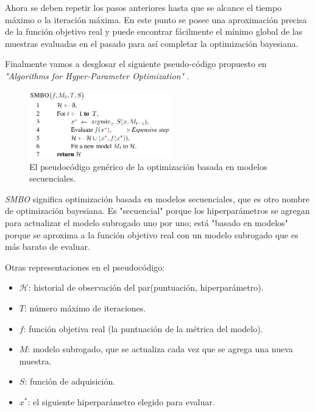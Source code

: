 \documentclass[a4paper,12pt]{article}
\begin{document}
\clearpage

Ahora se deben repetir los pasos anteriores hasta que se alcance el tiempo máximo o la iteración máxima. En este punto se posee una aproximación precisa de la función objetivo real y puede encontrar fácilmente el mínimo global de las muestras evaluadas en el pasado para así completar la optimización bayesiana.

Finalmente vamos a desglosar el siguiente pseudo-código propuesto en \textit{"Algorithms for Hyper-Parameter Optimization"} \citep{smbo}.

\begin{figure}[H]
	\begin{center}
		\includegraphics[width=0.55\textwidth]{smbo.png}
		\caption{El pseudocódigo genérico de la optimización  basada en modelos secuenciales.}
		\label{fig:smbo}
	\end{center}
\end{figure}

\textit{SMBO} significa optimización basada en modelos secuenciales, que es otro nombre de optimización bayesiana. Es "secuencial" porque los hiperparámetros se agregan para actualizar el modelo subrogado uno por uno; está "basado en modelos" porque se aproxima a la función objetivo real con un modelo subrogado que es más barato de evaluar.

Otras representaciones en el pseudocódigo:
\begin{itemize}[noitemsep, topsep=2pt]
	\item{$\mathcal{H}$: historial de observación del par(puntuación, hiperparámetro).}
	\item{$T$: número máximo de iteraciones.}
	\item{$f$: función objetiva real (la puntuación de la métrica del modelo).}
	\item{$M$: modelo subrogado, que se actualiza cada vez que se agrega una nueva muestra.}
	\item{$S$: función de adquisición.}
	\item{$x^*$: el siguiente hiperparámetro elegido para evaluar.}
\end{itemize}
\end{document}
